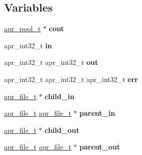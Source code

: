 \subsection*{Variables}
\begin{DoxyCompactItemize}
\item 
\mbox{\label{group__apr__thread__proc_ga859d4f4d4456dc729ea8b91a7512b928}} 
\mbox{\hyperlink{group__apr__pools_gaf137f28edcf9a086cd6bc36c20d7cdfb}{apr\+\_\+pool\+\_\+t}} $\ast$ {\bfseries cont}
\item 
\mbox{\label{group__apr__thread__proc_ga2e46fea00cc2238744ebca5061c62bcc}} 
apr\+\_\+int32\+\_\+t {\bfseries in}
\item 
\mbox{\label{group__apr__thread__proc_ga3444cd6e3b84456ad23aaa7c50921774}} 
apr\+\_\+int32\+\_\+t apr\+\_\+int32\+\_\+t {\bfseries out}
\item 
\mbox{\label{group__apr__thread__proc_ga156fcecee9d33dd7b55c3d8fdaba7159}} 
apr\+\_\+int32\+\_\+t apr\+\_\+int32\+\_\+t apr\+\_\+int32\+\_\+t {\bfseries err}
\item 
\mbox{\label{group__apr__thread__proc_gaf6f7b70534daa19fe7d4036872bc46cf}} 
\mbox{\hyperlink{structapr__file__t}{apr\+\_\+file\+\_\+t}} $\ast$ {\bfseries child\+\_\+in}
\item 
\mbox{\label{group__apr__thread__proc_ga82318d63768667f94f1eae2e87a930e1}} 
\mbox{\hyperlink{structapr__file__t}{apr\+\_\+file\+\_\+t}} \mbox{\hyperlink{structapr__file__t}{apr\+\_\+file\+\_\+t}} $\ast$ {\bfseries parent\+\_\+in}
\item 
\mbox{\label{group__apr__thread__proc_gaeca3a8d73bc4b2a26636f6ff979f5422}} 
\mbox{\hyperlink{structapr__file__t}{apr\+\_\+file\+\_\+t}} $\ast$ {\bfseries child\+\_\+out}
\item 
\mbox{\label{group__apr__thread__proc_ga1b49f722278b0ec3437cc5c2b5e2a72c}} 
\mbox{\hyperlink{structapr__file__t}{apr\+\_\+file\+\_\+t}} \mbox{\hyperlink{structapr__file__t}{apr\+\_\+file\+\_\+t}} $\ast$ {\bfseries parent\+\_\+out}

\end{DoxyCompactItemize}
